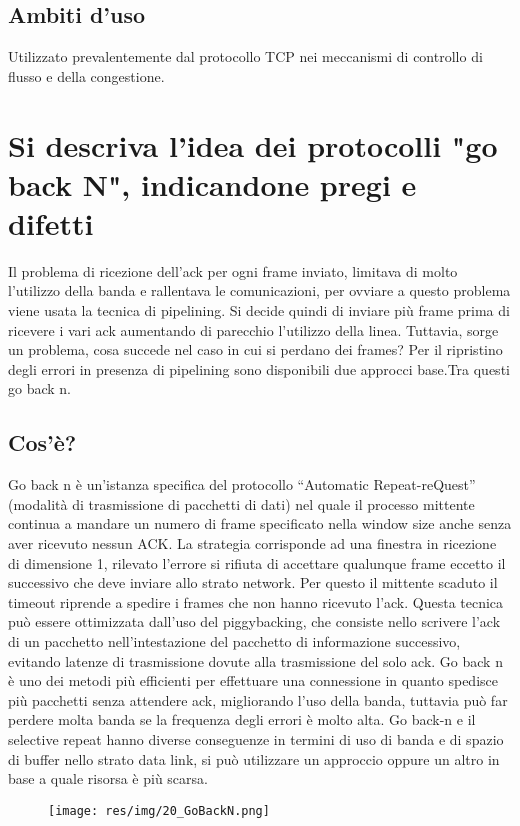 \subsection{Ambiti d'uso}
Utilizzato prevalentemente dal protocollo TCP nei meccanismi di controllo di flusso e della congestione.

\section{Si descriva l'idea dei protocolli "go back N", indicandone pregi e difetti}

Il problema di ricezione dell'ack per ogni frame inviato, limitava di molto l'utilizzo della banda e rallentava le comunicazioni, per ovviare a questo problema viene usata la tecnica di pipelining. Si decide quindi di inviare più frame prima di ricevere i vari ack aumentando di parecchio l'utilizzo della linea. Tuttavia, sorge un problema, cosa succede nel caso in cui si perdano dei frames? Per il ripristino degli errori in presenza di pipelining sono disponibili due approcci base.Tra questi go back n.
\subsection{Cos'è?}
Go back n è un'istanza specifica del protocollo “Automatic Repeat-reQuest” (modalità di trasmissione di pacchetti di dati) nel quale il processo mittente continua a mandare un numero di frame specificato nella window size anche senza aver ricevuto nessun ACK.
La strategia corrisponde ad una finestra in ricezione di dimensione 1, rilevato l'errore si rifiuta di accettare qualunque frame eccetto il successivo che deve inviare allo strato network. Per questo il mittente scaduto il timeout riprende a spedire i frames che non hanno ricevuto l'ack.
Questa tecnica può essere ottimizzata dall'uso del piggybacking, che consiste nello scrivere l'ack di un pacchetto nell'intestazione del pacchetto di informazione successivo, evitando latenze di trasmissione dovute alla trasmissione del solo ack.
Go back n è uno dei metodi più efficienti per effettuare una connessione in quanto spedisce più pacchetti senza attendere ack, migliorando l'uso della banda, tuttavia può far perdere molta banda se la frequenza degli errori è molto alta.
Go back-n e il selective repeat hanno diverse conseguenze in termini di uso di banda e di spazio di buffer nello strato data link, si può utilizzare un approccio oppure un altro in base a quale risorsa è più scarsa.

\begin{figure}[H]
\centering
\texttt{[image: res/img/20\_GoBackN.png]}
\end{figure}

